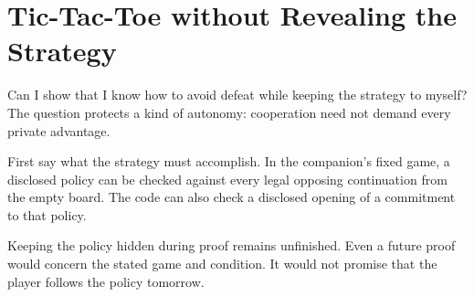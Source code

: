 \chapter{Tic-Tac-Toe without Revealing the Strategy}
\label{short:tic-tac-toe}

Can I show that I know how to avoid defeat while keeping the strategy to
myself? The question protects a kind of autonomy: cooperation need not demand
every private advantage.

First say what the strategy must accomplish. In the companion's fixed game,
a disclosed policy can be checked against every legal opposing continuation
from the empty board. The code can also check a disclosed opening of a
commitment to that policy.

Keeping the policy hidden during proof remains unfinished. Even a future
proof would concern the stated game and condition. It would not promise that
the player follows the policy tomorrow.

